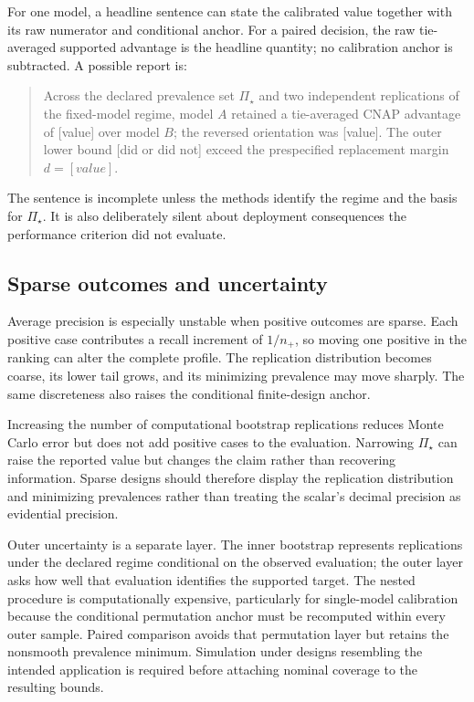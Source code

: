 \documentclass[11pt]{article}
\newcommand{\PSet}{\Pi_\star}
\theoremstyle{remark}
\begin{document}
For one model, a headline sentence can state the calibrated value together with its raw numerator and conditional anchor. For a paired decision, the raw tie-averaged supported advantage is the headline quantity; no calibration anchor is subtracted. A possible report is:

\begin{quote}
Across the declared prevalence set $\PSet$ and two independent replications of the fixed-model regime, model $A$ retained a tie-averaged CNAP advantage of [value] over model $B$; the reversed orientation was [value]. The outer lower bound [did or did not] exceed the prespecified replacement margin $d=[value]$.
\end{quote}

The sentence is incomplete unless the methods identify the regime and the basis for $\PSet$. It is also deliberately silent about deployment consequences the performance criterion did not evaluate.

\subsection{Sparse outcomes and uncertainty}

Average precision is especially unstable when positive outcomes are sparse. Each positive case contributes a recall increment of $1/n_+$, so moving one positive in the ranking can alter the complete profile. The replication distribution becomes coarse, its lower tail grows, and its minimizing prevalence may move sharply. The same discreteness also raises the conditional finite-design anchor.

Increasing the number of computational bootstrap replications reduces Monte Carlo error but does not add positive cases to the evaluation. Narrowing $\PSet$ can raise the reported value but changes the claim rather than recovering information. Sparse designs should therefore display the replication distribution and minimizing prevalences rather than treating the scalar's decimal precision as evidential precision.

Outer uncertainty is a separate layer. The inner bootstrap represents replications under the declared regime conditional on the observed evaluation; the outer layer asks how well that evaluation identifies the supported target. The nested procedure is computationally expensive, particularly for single-model calibration because the conditional permutation anchor must be recomputed within every outer sample. Paired comparison avoids that permutation layer but retains the nonsmooth prevalence minimum. Simulation under designs resembling the intended application is required before attaching nominal coverage to the resulting bounds.
\end{document}
